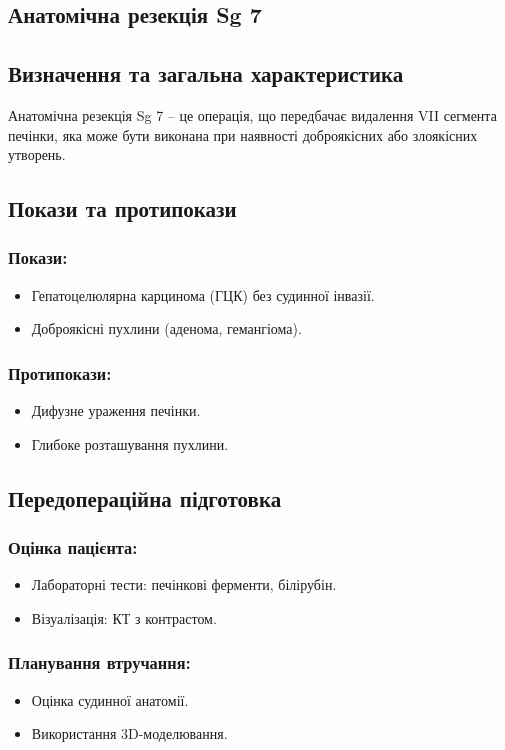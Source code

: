 \begin{refsection}
\section{Анатомічна резекція Sg 7}
\subsection{Визначення та загальна характеристика}
Анатомічна резекція Sg 7 – це операція, що передбачає видалення VII сегмента печінки, яка може бути виконана при наявності доброякісних або злоякісних утворень.

\subsection{Покази та протипокази}
\subsubsection{Покази:}
\begin{itemize}
    \item Гепатоцелюлярна карцинома (ГЦК) без судинної інвазії.
    \item Доброякісні пухлини (аденома, гемангіома).
\end{itemize}

\subsubsection{Протипокази:}
\begin{itemize}
    \item Дифузне ураження печінки.
    \item Глибоке розташування пухлини.
\end{itemize}

\subsection{Передопераційна підготовка}
\subsubsection{Оцінка пацієнта:}
\begin{itemize}
    \item Лабораторні тести: печінкові ферменти, білірубін.
    \item Візуалізація: КТ з контрастом.
\end{itemize}

\subsubsection{Планування втручання:}
\begin{itemize}
    \item Оцінка судинної анатомії.
    \item Використання 3D-моделювання.
\end{itemize}


\end{refsection}
